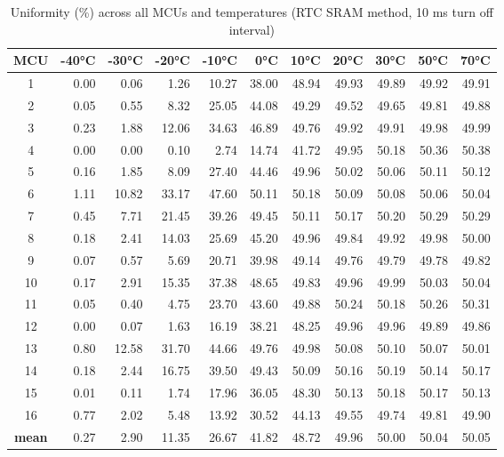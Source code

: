 \begin{table}[ht!]
    \centering
    \begin{tabular}{c||rrrrrrrrrr}
\toprule
\textbf{MCU} & \textbf{-40°C} & \textbf{-30°C} & \textbf{-20°C} & \textbf{-10°C} & \textbf{0°C} & \textbf{10°C} & \textbf{20°C} & \textbf{30°C} & \textbf{50°C} & \textbf{70°C} \\
\midrule
1    &   0.00 &   0.06 &   1.26 &  10.27 & 38.00 & 48.94 & 49.93 & 49.89 & 49.92 & 49.91 \\
2    &   0.05 &   0.55 &   8.32 &  25.05 & 44.08 & 49.29 & 49.52 & 49.65 & 49.81 & 49.88 \\
3    &   0.23 &   1.88 &  12.06 &  34.63 & 46.89 & 49.76 & 49.92 & 49.91 & 49.98 & 49.99 \\
4    &   0.00 &   0.00 &   0.10 &   2.74 & 14.74 & 41.72 & 49.95 & 50.18 & 50.36 & 50.38 \\
5    &   0.16 &   1.85 &   8.09 &  27.40 & 44.46 & 49.96 & 50.02 & 50.06 & 50.11 & 50.12 \\
6    &   1.11 &  10.82 &  33.17 &  47.60 & 50.11 & 50.18 & 50.09 & 50.08 & 50.06 & 50.04 \\
7    &   0.45 &   7.71 &  21.45 &  39.26 & 49.45 & 50.11 & 50.17 & 50.20 & 50.29 & 50.29 \\
8    &   0.18 &   2.41 &  14.03 &  25.69 & 45.20 & 49.96 & 49.84 & 49.92 & 49.98 & 50.00 \\
9    &   0.07 &   0.57 &   5.69 &  20.71 & 39.98 & 49.14 & 49.76 & 49.79 & 49.78 & 49.82 \\
10   &   0.17 &   2.91 &  15.35 &  37.38 & 48.65 & 49.83 & 49.96 & 49.99 & 50.03 & 50.04 \\
11   &   0.05 &   0.40 &   4.75 &  23.70 & 43.60 & 49.88 & 50.24 & 50.18 & 50.26 & 50.31 \\
12   &   0.00 &   0.07 &   1.63 &  16.19 & 38.21 & 48.25 & 49.96 & 49.96 & 49.89 & 49.86 \\
13   &   0.80 &  12.58 &  31.70 &  44.66 & 49.76 & 49.98 & 50.08 & 50.10 & 50.07 & 50.01 \\
14   &   0.18 &   2.44 &  16.75 &  39.50 & 49.43 & 50.09 & 50.16 & 50.19 & 50.14 & 50.17 \\
15   &   0.01 &   0.11 &   1.74 &  17.96 & 36.05 & 48.30 & 50.13 & 50.18 & 50.17 & 50.13 \\
16   &   0.77 &   2.02 &   5.48 &  13.92 & 30.52 & 44.13 & 49.55 & 49.74 & 49.81 & 49.90 \\
\textbf{mean} &   0.27 &   2.90 &  11.35 &  26.67 & 41.82 & 48.72 & 49.96 & 50.00 & 50.04 & 50.05 \\
\bottomrule
\end{tabular}
    \captionsetup{justification=centering,margin=0.5cm}
    \caption{Uniformity (\%) across all MCUs and temperatures (RTC SRAM method, 10 ms turn off interval)}
    \label{table:uniformity_rtc_sram}
    \vspace{-0.7cm}
\end{table}

